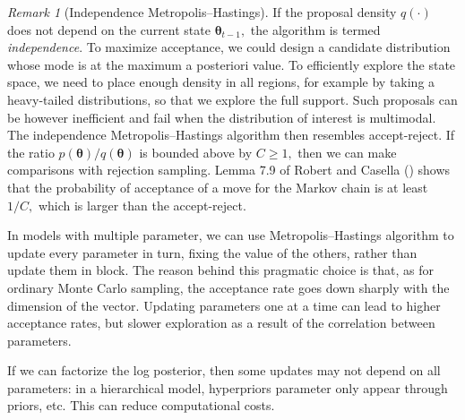 \documentclass[
  11pt,
  letterpaper,
]{scrbook}
\theoremstyle{definition}
\theoremstyle{plain}
\theoremstyle{plain}
\theoremstyle{plain}
\theoremstyle{definition}
\theoremstyle{definition}
\theoremstyle{plain}
\theoremstyle{plain}
\theoremstyle{remark}
\newtheorem*{remark}{Remark}
\begin{document}
\begin{remark}[Independence Metropolis--Hastings]
If the proposal density \(q(\cdot)\) does not depend on the current
state \(\boldsymbol{\theta}_{t-1},\) the algorithm is termed
\emph{independence}. To maximize acceptance, we could design a candidate
distribution whose mode is at the maximum a posteriori value. To
efficiently explore the state space, we need to place enough density in
all regions, for example by taking a heavy-tailed distributions, so that
we explore the full support. Such proposals can be however inefficient
and fail when the distribution of interest is multimodal. The
independence Metropolis--Hastings algorithm then resembles
accept-reject. If the ratio
\(p(\boldsymbol{\theta})/q(\boldsymbol{\theta})\) is bounded above by
\(C \geq 1,\) then we can make comparisons with rejection sampling.
Lemma 7.9 of Robert and Casella
() shows that the probability of
acceptance of a move for the Markov chain is at least \(1/C,\) which is
larger than the accept-reject.
\end{remark}

In models with multiple parameter, we can use Metropolis--Hastings
algorithm to update every parameter in turn, fixing the value of the
others, rather than update them in block. The reason behind this
pragmatic choice is that, as for ordinary Monte Carlo sampling, the
acceptance rate goes down sharply with the dimension of the vector.
Updating parameters one at a time can lead to higher acceptance rates,
but slower exploration as a result of the correlation between
parameters.

If we can factorize the log posterior, then some updates may not depend
on all parameters: in a hierarchical model, hyperpriors parameter only
appear through priors, etc. This can reduce computational costs.
\end{document}
